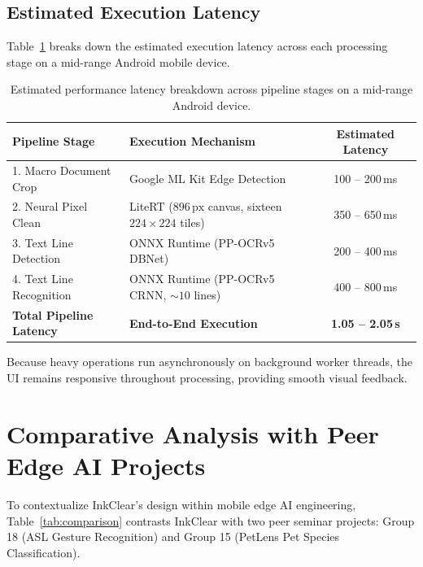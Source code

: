 \documentclass[11pt,a4paper]{article}
\begin{document}
\subsection{Estimated Execution Latency}
Table~\ref{tab:performance} breaks down the estimated execution latency across each processing stage on a mid-range Android mobile device.

\begin{table}[h]
\centering
\small
\begin{tabular}{lp{6cm}c}
\toprule
\textbf{Pipeline Stage} & \textbf{Execution Mechanism} & \textbf{Estimated Latency} \\
\midrule
1. Macro Document Crop & Google ML Kit Edge Detection & 100 -- 200\,ms \\
2. Neural Pixel Clean & LiteRT ($896\,\text{px}$ canvas, sixteen $224\times 224$ tiles) & 350 -- 650\,ms \\
3. Text Line Detection & ONNX Runtime (PP-OCRv5 DBNet) & 200 -- 400\,ms \\
4. Text Line Recognition & ONNX Runtime (PP-OCRv5 CRNN, $\sim 10$ lines) & 400 -- 800\,ms \\
\midrule
\textbf{Total Pipeline Latency} & \textbf{End-to-End Execution} & \textbf{1.05 -- 2.05\,s} \\
\bottomrule
\end{tabular}
\caption{Estimated performance latency breakdown across pipeline stages on a mid-range Android device.}
\label{tab:performance}
\end{table}

Because heavy operations run asynchronously on background worker threads, the UI remains responsive throughout processing, providing smooth visual feedback.

\section{Comparative Analysis with Peer Edge AI Projects}

To contextualize InkClear's design within mobile edge AI engineering, Table~\ref{tab:comparison} contrasts InkClear with two peer seminar projects: Group 18 (ASL Gesture Recognition) and Group 15 (PetLens Pet Species Classification).
\end{document}
